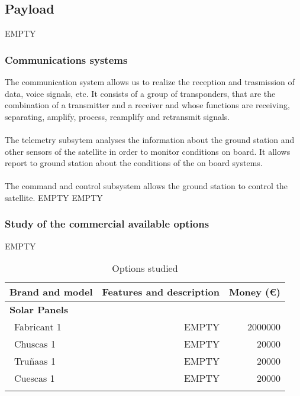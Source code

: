 \subsection{Payload}

EMPTY

\subsubsection{Communications systems}
The communication system allows us to realize the reception and trasmission of data, voice signals, etc. It consists of a group of transponders, that are the combination of a transmitter and a receiver and whose functions are receiving, separating, amplify, process, reamplify and retransmit signals.
	\paragraph{} 
	The telemetry subsytem analyses the information about the ground station and other sensors of the satellite in 	order to monitor conditions on board. It allows report to ground station about the conditions of the on board 			systems.
	\paragraph{} 
	The command and control subsystem allows the ground station to control the satellite.
EMPTY
EMPTY

\subsubsection{Study of the commercial available options}
EMPTY
\begin{longtable}{| l | r | r | }
	\hline
	\rowcolor[gray]{0.80}	\textbf{Brand and model} &  \textbf{Features and description}     & \textbf{Money (\euro)}   \\
	\hline
	\endfirsthead
	
	\rowcolor[gray]{0.85} \textbf{Solar Panels} &  &  \\
	~Fabricant 1 & EMPTY & 2000000 \\
	~Chuscas 1 & EMPTY & 20000 \\
	~Truñaas 1 & EMPTY & 20000 \\
	~Cuescas 1 & EMPTY & 20000 \\
	\hline
	
	\caption{Options studied}
	\label{epsoptionstable}
\end{longtable}

